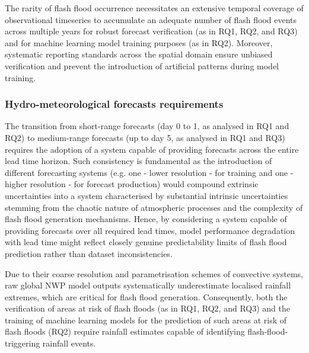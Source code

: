 The  rarity of flash flood occurrence necessitates an extensive temporal coverage of observational timeseries to accumulate an adequate number of flash flood events across multiple years for robust forecast verification (as in RQ1, RQ2, and RQ3) and for machine learning model training purposes (as in RQ2). Moreover, systematic reporting standards across the spatial domain ensure unbiased verification and prevent the introduction of artificial patterns during model training.

\subsubsection{Hydro-meteorological forecasts requirements}

The  transition from short-range forecasts (day 0 to 1, as analysed in RQ1 and RQ2) to medium-range forecasts (up to day 5, as analysed in RQ1 and RQ3) requires the adoption of a system capable of providing forecasts across the entire lead time horizon. Such consistency is fundamental as the introduction of different forecasting systems (e.g. one - lower resolution - for training and one - higher resolution - for forecast production) would compound extrinsic uncertainties into a system characterised by substantial intrinsic uncertainties stemming from the chaotic nature of atmospheric processes and the complexity of flash flood generation mechanisms. Hence, by considering a system capable of providing forecasts over all required lead times, model performance degradation with lead time might reflect closely genuine predictability limits of flash flood prediction rather than dataset inconsistencies.

Due  to their coarse resolution and parametrisation schemes of convective systems, raw global NWP model outputs systematically underestimate localised rainfall extremes, which are critical for flash flood generation. Consequently, both the verification of areas at risk of flash floods (as in RQ1, RQ2, and RQ3) and the training of machine learning models for the prediction of such areas at risk of flash floods (RQ2) require rainfall estimates capable of identifying flash-flood-triggering rainfall events. 

